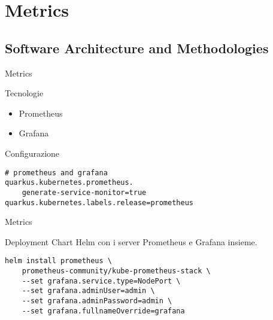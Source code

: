 \section{Metrics}

\subsection{Software Architecture and Methodologies}

\begin{frame}[fragile]{Metrics}
    \begin{block}{Tecnologie}
        \begin{itemize}
            \item Prometheus
            \item Grafana
        \end{itemize}
    \end{block}
    \begin{block}{Configurazione}
        \begin{verbatim}
# prometheus and grafana
quarkus.kubernetes.prometheus.
    generate-service-monitor=true
quarkus.kubernetes.labels.release=prometheus
        \end{verbatim}
    \end{block}
\end{frame}

\begin{frame}[fragile]{Metrics}
    \begin{block}{Deployment}
        Chart Helm con i server Prometheus e Grafana insieme.
        \begin{verbatim}
helm install prometheus \
    prometheus-community/kube-prometheus-stack \
    --set grafana.service.type=NodePort \
    --set grafana.adminUser=admin \
    --set grafana.adminPassword=admin \
    --set grafana.fullnameOverride=grafana
        \end{verbatim}
    \end{block}
\end{frame}